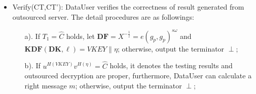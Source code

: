 \documentclass[smallextended]{svjour3}       %
\begin{document}
\begin{itemize}
	\item Verify(CT,CT'): DataUser verifies the correctness of result generated from outsourced server.
		  The detail procedures are as followings: 
		\begin{itemize}
			\item[a).] If $T_1=\widehat{C}$ holds, let $\textbf{DF}=X^{-\frac{1}{z}}=e(g_p,g_p)^{s \omega}$ and $\textbf{KDF}(\textbf{DK},\ell)=VKEY \parallel \eta$; otherwise, output the terminator $\perp$;
			\item[b).] If $u^{H(VKEY)}v^{H(\eta)}=\widehat{C}$ holds, it denotes the testing results and outsourced decryption are proper, furthermore, DataUser can calculate a right message $m$; otherwise, output the terminator $\perp$; 
		\end{itemize}
\end{itemize}

 
\end{document}
